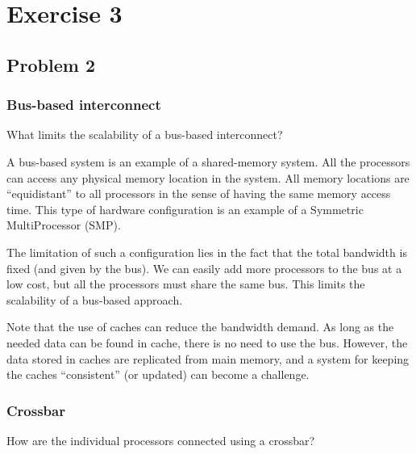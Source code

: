 
\section{Exercise 3} %
\label{sec:exercise_3}

\subsection{Problem 2} %
\label{sub:problem_2}

\subsubsection{Bus-based interconnect} %
\label{ssub:bus_based_interconnect}

\begin{question}
  What limits the scalability of a bus-based interconnect?
\end{question}

A bus-based system is an example of a shared-memory system. All the processors can access any physical memory location in the system. All memory locations are ``equidistant'' to all processors in the sense of having the same memory access time. This type of hardware configuration is an example of a Symmetric MultiProcessor (SMP).

The limitation of such a configuration lies in the fact that the total bandwidth is fixed (and given by the bus). We can easily add more processors to the bus at a low cost, but all the processors must share the same bus. This limits the scalability of a bus-based approach.

Note that the use of caches can reduce the bandwidth demand. As long as the needed data can be found in cache, there is no need to use the bus. However, the data stored in caches are replicated from main memory, and a system for keeping the caches “consistent” (or updated) can become a challenge.

\subsubsection{Crossbar} %
\label{ssub:crossbar}

\begin{question}
  How are the individual processors connected using a crossbar?
\end{question}

